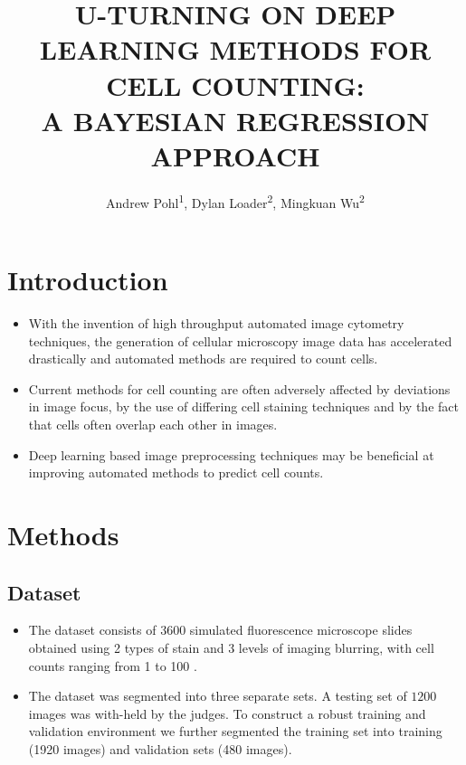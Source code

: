 \documentclass[isoft]{poster_class_UofC}
\title{\uppercase{U-turning on Deep Learning Methods for Cell Counting:\\ A Bayesian Regression Approach}}
\author{Andrew Pohl\textsuperscript{1}, Dylan Loader\textsuperscript{2}, Mingkuan Wu\textsuperscript{2}}
\begin{document}
    \begin{poster}
    
    \section{Introduction}
\begin{itemize}
\item With the invention of high throughput automated image cytometry techniques, the generation of cellular microscopy image data has accelerated drastically and automated methods are required to count cells.  

\item Current methods for cell counting are often adversely affected by deviations in image focus, by the use of differing cell staining techniques and by the fact that cells often overlap each other in images. 

\item Deep learning based image preprocessing techniques may be beneficial at improving automated methods to predict cell counts.
\end{itemize}


        
    \section{Methods}%
        
        \subsection{Dataset}
\begin{itemize}
\item The dataset consists of 3600 simulated fluorescence microscope slides obtained using 2 types of stain and 3 levels of imaging blurring, with cell counts ranging from 1 to 100 \cite{VebjornLjosa2012Ahmi}.

\item The dataset was segmented into three separate sets.  A testing set of $1200$ images was with-held by the judges.  To construct a robust training and validation environment we further segmented the training set into training (1920 images) and validation sets (480 images).
\end{itemize}
      

\end{poster}
\end{document}
